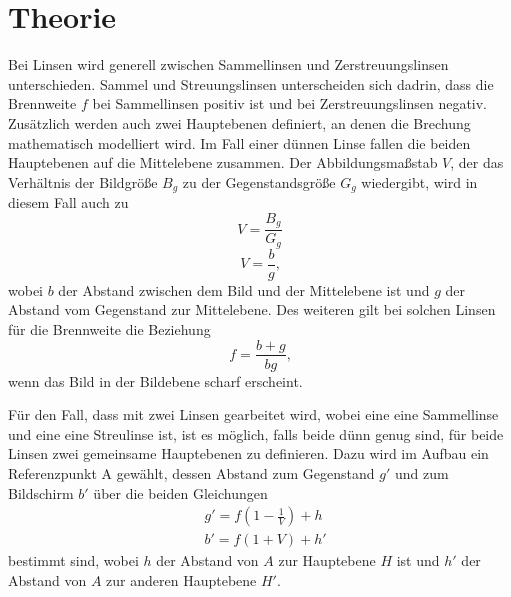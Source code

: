 \section{Theorie}
\label{sec:Theorie}

    \noindent Bei Linsen wird generell zwischen Sammellinsen und Zerstreuungslinsen unterschieden. Sammel und Streuungslinsen unterscheiden sich dadrin, dass die Brennweite $f$ bei Sammellinsen positiv ist und bei Zerstreuungslinsen negativ.
    Zusätzlich werden auch zwei Hauptebenen definiert, an denen die Brechung mathematisch modelliert wird. Im Fall einer dünnen Linse fallen die beiden Hauptebenen auf die Mittelebene zusammen. Der Abbildungsmaßstab $V$, der das Verhältnis der Bildgröße $B_g$
    zu der Gegenstandsgröße $G_g$ wiedergibt, wird in diesem Fall auch zu
    \begin{equation}
        V=\frac{B_g}{G_g} 
        \label{eqn:abbildung1}
    \end{equation}
    \begin{equation}
        V=\frac{b}{g} \text{,}
        \label{eqn:abbildung2}
    \end{equation}
    \noindent wobei $b$ der Abstand zwischen dem Bild und der Mittelebene ist und $g$ der Abstand vom Gegenstand zur Mittelebene.
    Des weiteren gilt bei solchen Linsen für die Brennweite die Beziehung
    \begin{equation}
        f=\frac{b+g}{bg} \text{,}
        \label{eqn:brenn1}
    \end{equation}
    \noindent wenn das Bild in der Bildebene scharf erscheint.

    Für den Fall, dass mit zwei Linsen gearbeitet wird, wobei eine eine Sammellinse und eine eine Streulinse ist, ist es möglich, falls beide dünn genug sind, für beide Linsen zwei gemeinsame Hauptebenen zu definieren.
    Dazu wird im Aufbau ein Referenzpunkt A gewählt, dessen Abstand zum Gegenstand $g'$ und zum Bildschirm $b'$ über die beiden Gleichungen
    \begin{align}
       & g'=f(1-\frac{1}{V})+h \\
        & b'=f(1+V)+h'
        \label{eqn:abbe}
    \end{align}
    bestimmt sind, wobei $h$ der Abstand von $A$ zur Hauptebene $H$ ist und $h'$ der Abstand von $A$ zur anderen Hauptebene $H'$.
\cite{sample}

